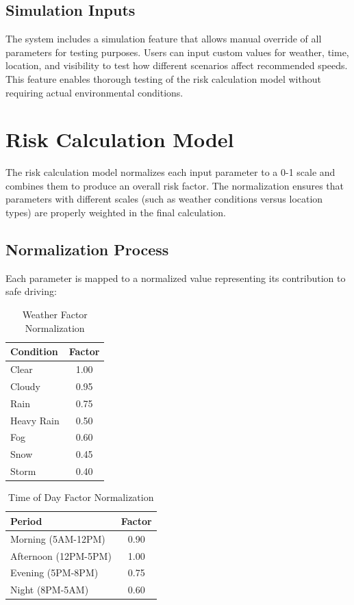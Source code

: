 \subsection{Simulation Inputs}
The system includes a simulation feature that allows manual override of all parameters for testing purposes. Users can input custom values for weather, time, location, and visibility to test how different scenarios affect recommended speeds. This feature enables thorough testing of the risk calculation model without requiring actual environmental conditions.

\section{Risk Calculation Model}
The risk calculation model normalizes each input parameter to a 0-1 scale and combines them to produce an overall risk factor. The normalization ensures that parameters with different scales (such as weather conditions versus location types) are properly weighted in the final calculation.

\subsection{Normalization Process}
Each parameter is mapped to a normalized value representing its contribution to safe driving:

\begin{table}[h]
\centering
\caption{Weather Factor Normalization}
\label{tab:weather}
\begin{tabular}{|l|c|}
\hline
\textbf{Condition} & \textbf{Factor} \\
\hline
Clear & 1.00 \\
Cloudy & 0.95 \\
Rain & 0.75 \\
Heavy Rain & 0.50 \\
Fog & 0.60 \\
Snow & 0.45 \\
Storm & 0.40 \\
\hline
\end{tabular}
\end{table}

\begin{table}[h]
\centering
\caption{Time of Day Factor Normalization}
\label{tab:time}
\begin{tabular}{|l|c|}
\hline
\textbf{Period} & \textbf{Factor} \\
\hline
Morning (5AM-12PM) & 0.90 \\
Afternoon (12PM-5PM) & 1.00 \\
Evening (5PM-8PM) & 0.75 \\
Night (8PM-5AM) & 0.60 \\
\hline
\end{tabular}
\end{table}

